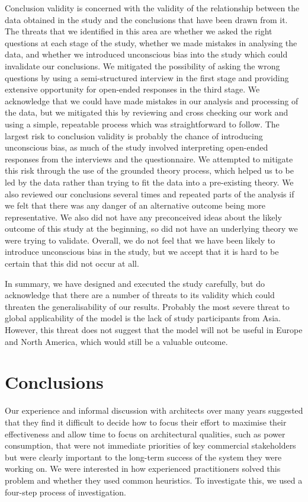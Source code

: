 Conclusion validity is concerned with the validity of the relationship between the data obtained in the study and the conclusions that have been drawn from it.  The threats that we identified in this area are whether we asked the right questions at each stage of the study, whether we made mistakes in analysing the data, and whether we introduced unconscious bias into the study which could invalidate our conclusions.  We mitigated the possibility of asking the wrong questions by using a semi-structured interview in the first stage and providing extensive opportunity for open-ended responses in the third stage.  We acknowledge that we could have made mistakes in our analysis and processing of the data, but we mitigated this by reviewing and cross checking our work and using a simple, repeatable process which was straightforward to follow.  The largest risk to conclusion validity is probably the chance of introducing unconscious bias, as much of the study involved interpreting open-ended responses from the interviews and the questionnaire.  We attempted to mitigate this risk through the use of the grounded theory process, which helped us to be led by the data rather than trying to fit the data into a pre-existing theory.  We also reviewed our conclusions several times and repeated parts of the analysis if we felt that there was any danger of an alternative outcome being more representative.  We also did not have any preconceived ideas about the likely outcome of this study at the beginning, so did not have an underlying theory we were trying to validate.  Overall, we do not feel that we have been likely to introduce unconscious bias in the study, but we accept that it is hard to be certain that this did not occur at all.

In summary, we have designed and executed the study carefully, but do acknowledge that there are a number of threats to its validity which could threaten the generalisability of our results.  Probably the most severe threat to global applicability of the model is the lack of study participants from Asia.  However, this threat does not suggest that the model will not be useful in Europe and North America, which would still be a valuable outcome.

\section{Conclusions}

Our experience and informal discussion with architects over many years suggested that they find it difficult to decide how to focus their effort to maximise their effectiveness and allow time to focus on architectural qualities, such as power consumption, that were not immediate priorities of key commercial stakeholders but were clearly important to the long-term success of the system they were working on.  We were interested in how experienced practitioners solved this problem and whether they used common heuristics.  To investigate this, we used a four-step process of investigation.

